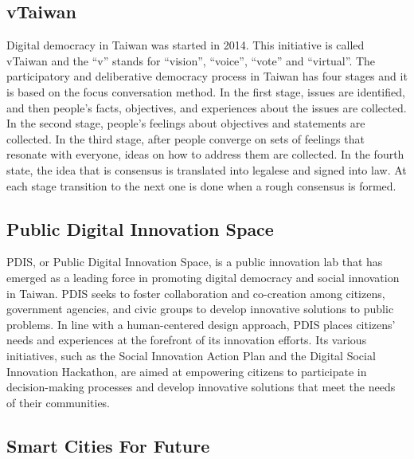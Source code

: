 \documentclass{IEEEtran}
\begin{document}
\subsection{vTaiwan}
Digital democracy in Taiwan was started in 2014. This initiative is called vTaiwan and the “v” stands for “vision”, “voice”, “vote” and “virtual”. The participatory and deliberative democracy process in Taiwan has four stages and it is based on the focus conversation method. In the first stage, issues are identified, and then people’s facts, objectives, and experiences about the issues are collected. In the second stage, people's feelings about objectives and statements are collected. In the third stage, after people converge on sets of feelings that resonate with everyone, ideas on how to address them are collected. In the fourth state, the idea that is consensus is translated into legalese and signed into law. At each stage transition to the next one is done when a rough consensus is formed.


\subsection{Public Digital Innovation Space}
PDIS, or Public Digital Innovation Space, is a public innovation lab that has emerged as a leading force in promoting digital democracy and social innovation in Taiwan. PDIS seeks to foster collaboration and co-creation among citizens, government agencies, and civic groups to develop innovative solutions to public problems.
In line with a human-centered design approach, PDIS places citizens' needs and experiences at the forefront of its innovation efforts. Its various initiatives, such as the Social Innovation Action Plan and the Digital Social Innovation Hackathon, are aimed at empowering citizens to participate in decision-making processes and develop innovative solutions that meet the needs of their communities.



\subsection{Smart Cities For Future}
\end{document}
